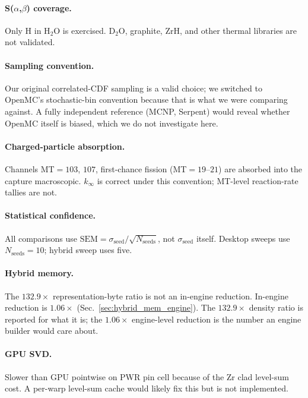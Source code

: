 \documentclass[11pt,a4paper]{article}
\begin{document}
\paragraph{S($\alpha$,$\beta$) coverage.}
Only H in H$_2$O is exercised. D$_2$O, graphite, ZrH, and
other thermal libraries are not validated.

\paragraph{Sampling convention.}
Our original correlated-CDF sampling is a valid choice; we
switched to OpenMC's stochastic-bin convention because that
is what we were comparing against. A fully independent
reference (MCNP, Serpent) would reveal whether OpenMC itself
is biased, which we do not investigate here.

\paragraph{Charged-particle absorption.}
Channels MT$=103$, $107$, first-chance fission
(MT$=19$--$21$) are absorbed into the capture macroscopic.
$k_\infty$ is correct under this convention; MT-level
reaction-rate tallies are not.

\paragraph{Statistical confidence.}
All comparisons use $\mathrm{SEM} =
\sigma_\text{seed}/\sqrt{N_\text{seeds}}$, not
$\sigma_\text{seed}$ itself. Desktop sweeps use
$N_\text{seeds} = 10$; hybrid sweep uses five.

\paragraph{Hybrid memory.}
The $132.9\times$ representation-byte ratio is not an
in-engine reduction. In-engine reduction is $1.06\times$
(Sec.~\ref{sec:hybrid_mem_engine}). The $132.9\times$
density ratio is reported for what it is; the
$1.06\times$ engine-level reduction is the number an
engine builder would care about.

\paragraph{GPU SVD.}
Slower than GPU pointwise on PWR pin cell because of the Zr
clad level-sum cost. A per-warp level-sum cache would likely
fix this but is not implemented.
\end{document}
